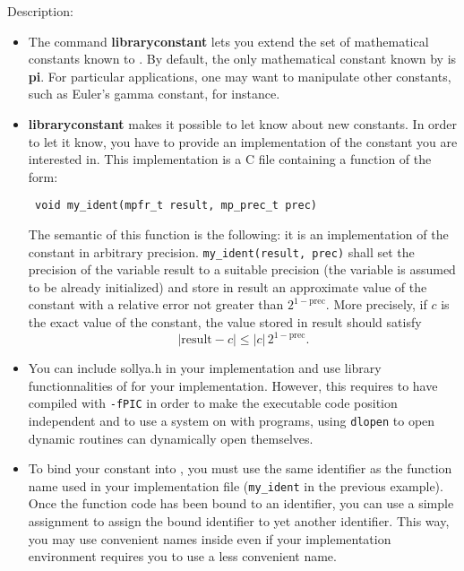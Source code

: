 \noindent Description: \begin{itemize}

\item The command \textbf{libraryconstant} lets you extend the set of mathematical
   constants known to \sollya.
   By default, the only mathematical constant known by \sollya is \textbf{pi}.
   For particular applications, one may want to
   manipulate other constants, such as Euler's gamma constant, for instance.

\item \textbf{libraryconstant} makes it possible to let \sollya know about new constants.
   In order to let it know, you have to provide an implementation of the
   constant you are interested in. This implementation is a C file containing
   a function of the form:
   \begin{verbatim} void my_ident(mpfr_t result, mp_prec_t prec)\end{verbatim}
   The semantic of this function is the following: it is an implementation of
   the constant in arbitrary precision.
   \verb|my_ident(result, prec)| shall set the
   precision of the variable result to a suitable precision (the variable is
   assumed to be already initialized) and store in result an approximate value
   of the constant with a relative error not greater than $2^{1-\mathrm{prec}}$.
   More precisely, if $c$ is the exact value of the constant, the value stored
   in result should satisfy $$|\mathrm{result}-c| \le |c|\,2^{1-\mathrm{prec}}.$$

\item You can include sollya.h in your implementation and use library 
   functionnalities of \sollya for your implementation. However, this requires to
   have compiled \sollya with \texttt{-fPIC} in order to make the \sollya executable
   code position independent and to use a system on with programs, using \texttt{dlopen}
   to open dynamic routines can dynamically open themselves.

\item To bind your constant into \sollya, you must use the same identifier as the
   function name used in your implementation file (\verb|my_ident| in the previous
   example). Once the function code has been bound to an identifier, you can use
   a simple assignment to assign the bound identifier to yet another identifier.
   This way, you may use convenient names inside \sollya even if your
   implementation environment requires you to use a less convenient name.


\end{itemize}
